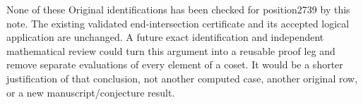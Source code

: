 \documentclass[11pt]{article}
\begin{document}
None of these Original identifications has been checked for position2739 by
this note. The existing validated end-intersection certificate and its
accepted logical application are unchanged. A future exact identification
and independent mathematical review could turn this argument into a reusable
proof leg and remove separate evaluations of every element of a coset. It
would be a shorter justification of that conclusion, not another computed
case, another original row, or a new manuscript/conjecture result.
\end{document}
